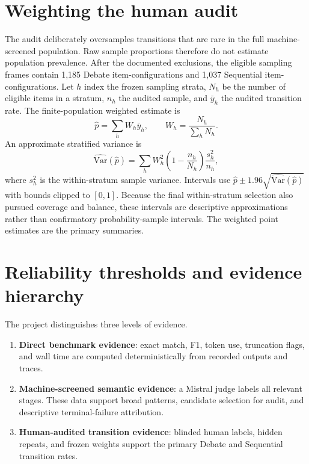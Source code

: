 \section{Weighting the human audit}

The audit deliberately oversamples transitions that are rare in the full machine-screened population. Raw sample proportions therefore do not estimate population prevalence. After the documented exclusions, the eligible sampling frames contain 1,185 Debate item-configurations and 1,037 Sequential item-configurations. Let $h$ index the frozen sampling strata, $N_h$ be the number of eligible items in a stratum, $n_h$ the audited sample, and $\bar{y}_h$ the audited transition rate. The finite-population weighted estimate is
\begin{equation}
  \hat{p} = \sum_h W_h\bar{y}_h, \qquad W_h = \frac{N_h}{\sum_h N_h}.
  \label{eq:weighting}
\end{equation}
An approximate stratified variance is
\begin{equation}
  \widehat{\mathrm{Var}}(\hat{p}) = \sum_h W_h^2\left(1-\frac{n_h}{N_h}\right)\frac{s_h^2}{n_h},
\end{equation}
where $s_h^2$ is the within-stratum sample variance. Intervals use $\hat{p} \pm 1.96\sqrt{\widehat{\mathrm{Var}}(\hat{p})}$ with bounds clipped to $[0,1]$. Because the final within-stratum selection also pursued coverage and balance, these intervals are descriptive approximations rather than confirmatory probability-sample intervals. The weighted point estimates are the primary summaries.

\section{Reliability thresholds and evidence hierarchy}

The project distinguishes three levels of evidence.

\begin{enumerate}[leftmargin=*]
  \item \textbf{Direct benchmark evidence}: exact match, F1, token use, truncation flags, and wall time are computed deterministically from recorded outputs and traces.
  \item \textbf{Machine-screened semantic evidence}: a Mistral judge labels all relevant stages. These data support broad patterns, candidate selection for audit, and descriptive terminal-failure attribution.
  \item \textbf{Human-audited transition evidence}: blinded human labels, hidden repeats, and frozen weights support the primary Debate and Sequential transition rates.
\end{enumerate}

